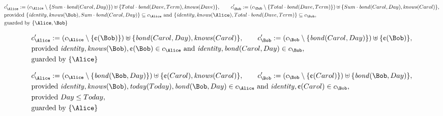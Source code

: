 \begin{align*}
&
c'_
{
\Alice
}
 := 
(c_
{
\Alice
}
 \setminus 
\{
Sum
\cdot
\mathit{
bond
}
(
Carol
,
Day
)
\}
) \uplus 
\{
Total
\cdot
\mathit{
bond
}
(
Dave
,
Term
)
,
\mathit{
knows
}
(
Dave
)
\}
, \qquad 
c'_
{
\Bob
}
 := 
(c_
{
\Bob
}
 \setminus 
\{
Total
\cdot
\mathit{
bond
}
(
Dave
,
Term
)
\}
) \uplus 
\{
Sum
\cdot
\mathit{
bond
}
(
Carol
,
Day
)
,
\mathit{
knows
}
(
Carol
)
\}
,\\
&
\text{provided } 
\{
\mathit{
identity
}
,
\mathit{
knows
}
(
\Bob
)
,
Sum
\cdot
\mathit{
bond
}
(
Carol
,
Day
)
\}
 \subseteq c_
{
\Alice
}
 \text{ and } 
\{
\mathit{
identity
}
,
\mathit{
knows
}
(
\Alice
)
,
Total
\cdot
\mathit{
bond
}
(
Dave
,
Term
)
\}
 \subseteq c_
{
\Bob
}
,\\
&
\text{guarded by } \{
\Alice
,
\Bob
\}
\end{align*}

\begin{align*}
&
c'_
{
\Alice
}
 := 
(c_
{
\Alice
}
 \setminus 
\{
\text{\textcent}
(
\Bob
)
\}
) \uplus 
\{
\mathit{
bond
}
(
Carol
,
Day
)
,
\mathit{
knows
}
(
Carol
)
\}
, \qquad 
c'_
{
\Bob
}
 := 
(c_
{
\Bob
}
 \setminus 
\{
\mathit{
bond
}
(
Carol
,
Day
)
\}
) \uplus 
\{
\text{\textcent}
(
\Bob
)
\}
,\\
&
\text{provided } 
\mathit{
identity
}
,
\mathit{
knows
}
(
\Bob
)
,
\text{\textcent}
(
\Bob
)
 \in c_
{
\Alice
}
 \text{ and } 
\mathit{
identity
}
,
\mathit{
bond
}
(
Carol
,
Day
)
 \in c_
{
\Bob
}
,\\
&
\text{guarded by } \{
\Alice
\}
\end{align*}

\begin{align*}
&
c'_
{
\Alice
}
 := 
(c_
{
\Alice
}
 \setminus 
\{
\mathit{
bond
}
(
\Bob
,
Day
)
\}
) \uplus 
\{
\text{\textcent}
(
Carol
)
,
\mathit{
knows
}
(
Carol
)
\}
, \qquad 
c'_
{
\Bob
}
 := 
(c_
{
\Bob
}
 \setminus 
\{
\text{\textcent}
(
Carol
)
\}
) \uplus 
\{
\mathit{
bond
}
(
\Bob
,
Day
)
\}
,\\
&
\text{provided } 
\mathit{
identity
}
,
\mathit{
knows
}
(
\Bob
)
,
\mathit{
today
}
(
Today
)
,
\mathit{
bond
}
(
\Bob
,
Day
)
 \in c_
{
\Alice
}
 \text{ and } 
\mathit{
identity
}
,
\text{\textcent}
(
Carol
)
 \in c_
{
\Bob
}
,\\
&
\text{provided } 
Day
\le
Today
,\\
&
\text{guarded by } \{
\Alice
\}
\end{align*}

